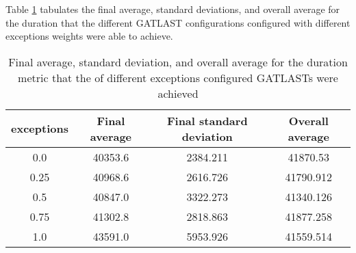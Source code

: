 Table \ref{tab:HP:GA:Exceptions:duration} tabulates the final average, standard deviations, and overall average for the duration that the different GATLAST configurations configured with different exceptions weights were able to achieve.
\begin{table}[tbh!]
\centering
\begin{adjustbox}{trim=0cm 0cm 0cm 0cm, clip=true}
\begin{tabular}{|c|c|c|c|}
\hline
exceptions & Final average & Final standard deviation & Overall average\\
\hline
0.0 & 40353.6 & 2384.211 & 41870.53\\\hline
0.25 & 40968.6 & 2616.726 & 41790.912\\\hline
0.5 & 40847.0 & 3322.273 & 41340.126\\\hline
0.75 & 41302.8 & 2818.863 & 41877.258\\\hline
1.0 & 43591.0 & 5953.926 & 41559.514\\\hline
\end{tabular}
\end{adjustbox}
\caption{Final average, standard deviation, and overall average for the duration metric that the of different exceptions configured GATLASTs were achieved}
\label{tab:HP:GA:Exceptions:duration}
\end{table}